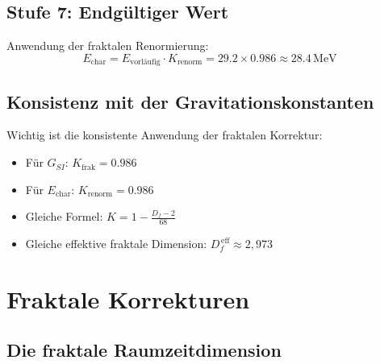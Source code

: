 	\subsection{Stufe 7: Endgültiger Wert}
	
	Anwendung der fraktalen Renormierung:
	\begin{equation}
		E_{\text{char}} = E_{\text{vorläufig}} \cdot K_{\text{renorm}} = 29.2 \times 0.986 \approx 28.4\,\text{MeV}
	\end{equation}
	
	\subsection{Konsistenz mit der Gravitationskonstanten}
	
	Wichtig ist die konsistente Anwendung der fraktalen Korrektur:
	\begin{itemize}
		\item Für $G_{SI}$: $K_{\text{frak}} = 0.986$
		\item Für $E_{\text{char}}$: $K_{\text{renorm}} = 0.986$
		\item Gleiche Formel: $K = 1 - \frac{D_f - 2}{68}$
		\item Gleiche effektive fraktale Dimension: $D_f^{\,\text{eff}} \approx 2{,}973$
	\end{itemize}
	
	\section{Fraktale Korrekturen}
	
	\subsection{Die fraktale Raumzeitdimension}
	
